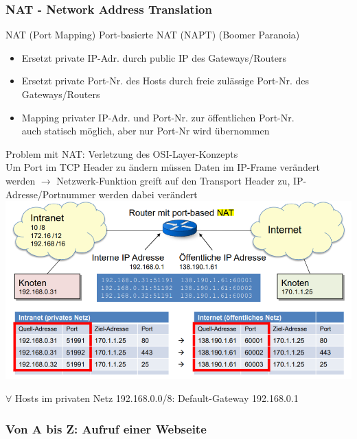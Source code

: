




\subsubsection{NAT - Network Address Translation}

\begin{definition}{NAT (Port Mapping)} Port-basierte NAT (NAPT) {\tiny (Boomer Paranoia)}    
    \begin{itemize}
        \item Ersetzt private IP-Adr. durch public IP des Gateways/Routers
        \item Ersetzt private Port-Nr. des Hosts durch freie zulässige Port-Nr. des Gateways/Routers
        \item Mapping privater IP-Adr. und Port-Nr. zur öffentlichen Port-Nr.
                \\auch statisch möglich, aber nur Port-Nr wird übernommen
    \end{itemize}
    Problem mit NAT: Verletzung des OSI-Layer-Konzepts\\
    Um Port im TCP Header zu ändern müssen Daten im IP-Frame verändert werden 
    $\rightarrow$ Netzwerk-Funktion greift auf den Transport Header zu,
    IP-Adresse/Portnummer werden dabei verändert\\
        \includegraphics[width=1\linewidth]{images/NAT.png}
\end{definition}
\begin{remark}
    $\forall$ Hosts im privaten Netz 192.168.0.0/8: Default-Gateway 192.168.0.1
\end{remark}

\subsubsection*{Von A bis Z: Aufruf einer Webseite}


